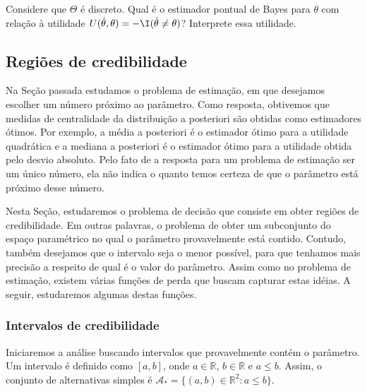 \begin{exercise}
Considere que $\Theta$ é discreto. Qual é o estimador pontual de Bayes para $\theta$
com relação à utilidade $U(\hat \theta,\theta)=-\I(\hat{\theta}\neq \theta)$?
Interprete essa utilidade.
\end{exercise}


\subsection{Regiões de credibilidade}

Na Seção passada estudamos 
o problema de estimação,
em que desejamos escolher 
um número próximo ao parâmetro.
Como resposta, obtivemos que 
medidas de centralidade da distribuição a posteriori
são obtidas como estimadores ótimos.
Por exemplo, a média a posteriori é 
o estimador ótimo para a utilidade quadrática e
a mediana a posteriori é o estimador ótimo para
a utilidade obtida pelo desvio absoluto.
Pelo fato de a resposta para 
um problema de estimação ser um único número,
ela não indica o quanto temos certeza de que
o parâmetro está próximo desse número.

Nesta Seção, estudaremos o problema de decisão que
consiste em obter regiões de credibilidade.
Em outras palavras, o problema de obter 
um subconjunto do espaço paramétrico no qual 
o parâmetro provavelmente está contido.
Contudo, também desejamos que o intervalo seja 
o menor possível, para que tenhamos mais 
precisão a respeito de qual é o valor do parâmetro.
Assim como no problema de estimação, 
existem várias funções de perda que
buscam capturar estas idéias. 
A seguir, estudaremos algumas destas funções.

\subsubsection{Intervalos de credibilidade}

Iniciaremos a análise buscando intervalos que 
provavelmente contém o parâmetro.
Um intervalo é definido como $[a,b]$, 
onde $a \in \mathbb{R}$, $b \in \mathbb{R}$ e 
$a \leq b$. Assim, o conjunto de alternativas simples é $\mathcal{A}_{*} = \{(a,b) \in \mathbb{R}^{2}: a \leq b\}$.

